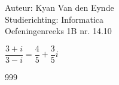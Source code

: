 \documentclass[a4paper]{article}
\begin{document}
  
\noindent \large Auteur: Kyan Van den Eynde \\
\noindent \large Studierichting: Informatica\\
\noindent \large Oefeningenreeks 1B nr. 14.10\\

\medskip

\normalsize

$\dfrac{3+i}{3-i} = \dfrac{4}{5} + \dfrac{3}{5}i$\\

\begin{thebibliography}{999}
\end{thebibliography}
\end{document}
